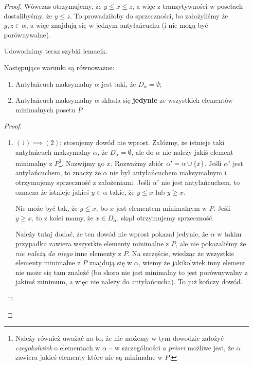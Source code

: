\begin{proof}
	Wówczas otrzymujemy, że \(y \leq x \leq z\), a więc z tranzytywności w posetach dostalibyśmy, że \(y \leq z\). To prowadziłoby do sprzeczności, bo założyliśmy że \(y, z \in \alpha\), a więc znajdują się w jednym antyłańcuchu (i nie mogą być porównywalne).

	Udowodnimy teraz szybki lemacik.

	\begin{lemma}
		\label{dilworth-lemma-1}
		Następujące warunki są równoważne:

		\begin{enumerate}
			\item Antyłańcuch maksymalny \(\alpha\) jest taki, że \(D_{\alpha} = \emptyset\);
			\item Antyłańcuch maksymalny \(\alpha\) składa się \textbf{jedynie} ze wszystkich elementów minimalnych posetu \(P\).
		\end{enumerate}
	\end{lemma}
	\begin{proof}
		\begin{enumerate}
			\item \( (1) \implies (2) \); stosujemy dowód nie wprost. Załóżmy, że istnieje taki antyłańcuch maksymalny \(\alpha\), że \(D_{\alpha} = \emptyset\), ale do \(\alpha\) nie należy jakiś element minimalny z \(P\)\footnote{Należy również uważać na to, że nie możemy w tym dowodzie założyć \textit{czegokolwiek} o elementach w \(\alpha\) -- w szczególności \textit{a priori} możliwe jest, że \(\alpha\) zawiera jakieś elementy które nie są minimalne w \(P\).}. Nazwijmy go \(x\). Rozważmy zbiór \( \alpha' = \alpha \cup \set{x}\). Jeśli \(\alpha'\) jest antyłańcuchem, to znaczy że \(\alpha\) nie był antyłańcuchem maksymalnym i otrzymujemy sprzeczność z założeniami. Jeśli \(\alpha'\) nie jest antyłańcuchem, to oznacza że istnieje jakieś \(y \in \alpha\) takie, że \( y \leq x\) lub \(y \geq x\).

			      Nie może być tak, że \(y \leq x\), bo \(x\) jest elementem minimalnym w \(P\). Jeśli \(y \geq x\), to z kolei mamy, że \(x \in D_{\alpha}\), skąd otrzymujemy sprzeczność.

			      Należy tutaj dodać, że ten dowód nie wprost pokazał jedynie, że \(\alpha\) w takim przypadku zawiera wszystkie elementy minimalne z \(P\), ale nie pokazaliśmy że \textit{nie należą do niego} inne elementy z \(P\). Na szczęście, wiedząc że wszystkie elementy minimalne z \(P\) znajdują się w \(\alpha\), wiemy że jakikolwiek inny element nie może się tam znaleźć (bo skoro nie jest minimalny to jest porównywalny z jakimś minimum, a więc nie należy do antyłańcucha). To już kończy dowód.


\end{enumerate}
\end{proof}
\end{proof}
